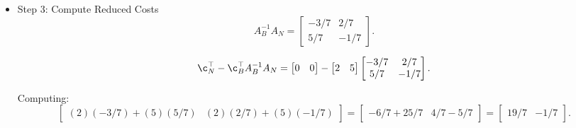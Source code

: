 \begin{solution}
\begin{itemize}
Thus, the system can be written as 
$$
\x_B = A_B^{-1} \b - A_B^{-1}A_N \x_N,
$$
that is
\begin{equation}
\begin{bmatrix} x_1 \\ x_2\end{bmatrix} = \begin{bmatrix} 6 \\ 5\end{bmatrix} - \begin{bmatrix}
    -3/7 & 2/7 \\
    5/7 & -1/7
\end{bmatrix} \begin{bmatrix} s_1 \\ s_2 \end{bmatrix},
\end{equation}
or equivalently
\begin{equation}
\begin{bmatrix} x_1 \\ x_2\end{bmatrix} = \begin{bmatrix} 6 \\ 5\end{bmatrix} - s_1 \begin{bmatrix}
    -3/7  \\
    5/7 
\end{bmatrix} - s_2 \begin{bmatrix}
     2/7 \\
    -1/7
\end{bmatrix} 
\end{equation}


\item {Step 3: Compute Reduced Costs}
\[
A_B^{-1} A_N =
\begin{bmatrix}
    -3/7 & 2/7 \\
    5/7 & -1/7
\end{bmatrix}.
\]

\[
\c_N^\top -\c_B^\top A_B^{-1} A_N =
\begin{bmatrix}
    0 & 0
\end{bmatrix}
-
\begin{bmatrix}
    2 & 5
\end{bmatrix}
\begin{bmatrix}
    -3/7 & 2/7 \\
    5/7 & -1/7
\end{bmatrix}.
\]

Computing:
\[
\begin{bmatrix}
    (2)(-3/7) + (5)(5/7) & (2)(2/7) + (5)(-1/7)
\end{bmatrix}
=
\begin{bmatrix}
    -6/7 + 25/7 & 4/7 - 5/7
\end{bmatrix}
=
\begin{bmatrix}
    19/7 & -1/7
\end{bmatrix}.
\]


\end{itemize}
\end{solution}
